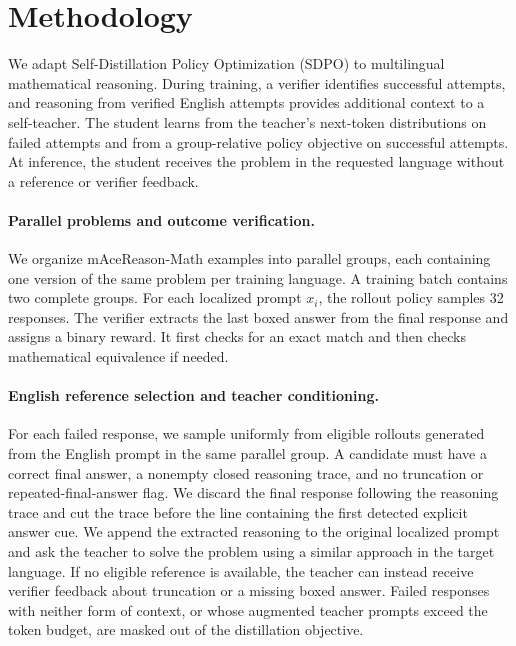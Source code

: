 \documentclass[11pt]{article}
\begin{document}
\section{Methodology}
\label{sec:sdpo-methodology}

We adapt Self-Distillation Policy Optimization (SDPO)
\cite{hubotter2026sdpo} to multilingual mathematical reasoning.
During training, a verifier identifies successful attempts, and reasoning
from verified English attempts provides additional context to a self-teacher.
The student learns from the teacher's next-token distributions on failed
attempts and from a group-relative policy objective on successful attempts.
At inference, the student receives the problem in the requested language
without a reference or verifier feedback.

\paragraph{Parallel problems and outcome verification.}
We organize mAceReason-Math examples into parallel groups, each containing
one version of the same problem per training language. A training batch
contains two complete groups. For each localized prompt \(x_i\), the
rollout policy samples 32 responses. The verifier extracts the last boxed
answer from the final response and assigns a binary reward. It first checks
for an exact match and then checks mathematical equivalence if needed.

\paragraph{English reference selection and teacher conditioning.}
For each failed response, we sample uniformly from eligible rollouts
generated from the English prompt in the same parallel group. A candidate
must have a correct final answer, a nonempty closed reasoning trace, and
no truncation or repeated-final-answer flag. We discard the final response
following the reasoning trace and cut the trace before the line containing
the first detected explicit answer cue. We append the extracted reasoning
to the original localized prompt and ask the teacher to solve the problem
using a similar approach in the target language. If no eligible reference
is available, the teacher can instead receive verifier feedback about
truncation or a missing boxed answer. Failed responses with neither form
of context, or whose augmented teacher prompts exceed the token budget,
are masked out of the distillation objective.
\end{document}
